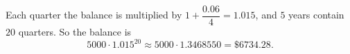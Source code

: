 Each quarter the balance is multiplied by $1+\dfrac{0.06}{4}=1.015$, and $5$ years contain $20$ quarters. So the balance is
\[
5000\cdot1.015^{20}\approx5000\cdot1.3468550=\boxed{\$6734.28}.
\]
